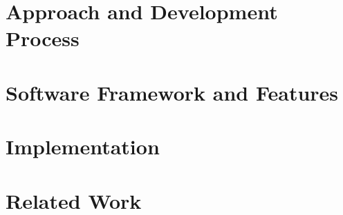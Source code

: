 \documentclass[preprint]{elsarticle}
\begin{document}
\section{Approach and Development Process}
\label{sec:pamproc}


\section{Software Framework and Features}
\label{sec:architecture}


\section{Implementation}
\label{sec:implementation}


%


\label{sec:Experimentations}


\section{Related Work}
\label{sec:related}


%

%

%

%






\end{document}
